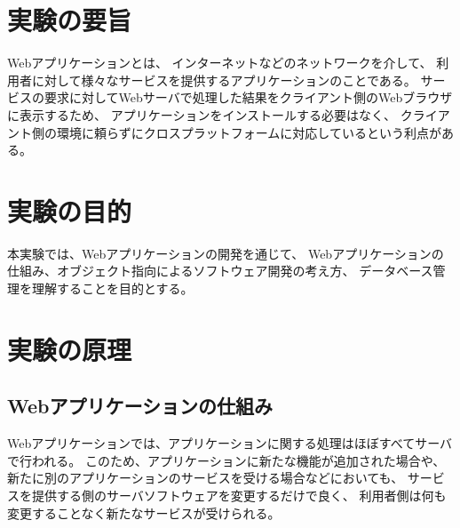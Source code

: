 \documentclass[12pt]{jarticle}
\begin{document}



\section{実験の要旨}
Webアプリケーションとは、
インターネットなどのネットワークを介して、
利用者に対して様々なサービスを提供するアプリケーションのことである。
サービスの要求に対してWebサーバで処理した結果をクライアント側のWebブラウザに表示するため、
アプリケーションをインストールする必要はなく、
クライアント側の環境に頼らずにクロスプラットフォームに対応しているという利点がある。

\section{実験の目的}
本実験では、Webアプリケーションの開発を通じて、
Webアプリケーションの仕組み、オブジェクト指向によるソフトウェア開発の考え方、
データベース管理を理解することを目的とする。

\section{実験の原理}
\subsection{Webアプリケーションの仕組み}
Webアプリケーションでは、アプリケーションに関する処理はほぼすべてサーバで行われる。
このため、アプリケーションに新たな機能が追加された場合や、
新たに別のアプリケーションのサービスを受ける場合などにおいても、
サービスを提供する側のサーバソフトウェアを変更するだけで良く、
利用者側は何も変更することなく新たなサービスが受けられる。
\end{document}
